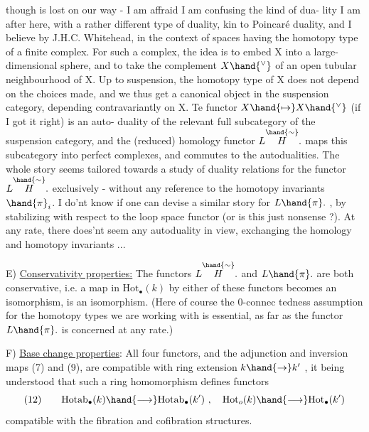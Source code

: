 
 though is lost on our way - I am affraid I am confusing the kind of dua-%
lity I am after here, with a rather different type of duality, kin to
Poincaré duality, and   I believe by J.H.C. Whitehead, in the context
of spaces having the homotopy type of a finite complex. For such a
complex, the idea  is to embed X into a large-dimensional sphere, and
to take the complement $X\hand{^{\vee}}$ of an open tubular neighbourhood of X. Up to
suspension, the homotopy type of X does not depend on the choices made,
and  we thus get a canonical object in the suspension category, depending
contravariantly on X. Te functor $X\hand{\mapsto}X\hand{^{\vee}}$ (if I got it right) is an auto-%
duality of the relevant full subcategory of the suspension category,
and the (reduced) homology functor $L\overset{\hand{\sim}}{H}.$  maps this subcategory
into perfect complexes, and commutes to the autodualities. The whole
story seems tailored towards a study of duality relations for the functor
$L\overset{\hand{\sim}}{H}.$ exclusively - without any reference to the homotopy invariants $\hand{\pi}_{i}$.
I do'nt know if one can devise a similar story for $L\hand{\pi}.$ , by stabilizing
with respect to the loop space functor (or is this just nonsense ?). At
any rate, there does'nt seem any autoduality in view, exchanging the
homology and homotopy invariants ...

E) \uline{Conservativity properties:} The functors $L\overset{\hand{\sim}}{H}.$ and $L\hand{\pi}.$ are both
conservative, i.e. a map in $\mathrm{Hot}_{\bullet}(k)$   by either of these functors
becomes an isomorphism, is an isomorphism. (Here of course the 0-connec%
\hand{-}tedness assumption for the  homotopy types we are working
with is essential, as far as the functor $L\hand{\pi}.$ is concerned at any rate.)

F) \uline{Base change properties}: All four functors, and the adjunction
and inversion maps (7) and (9), are compatible with ring extension
$k\hand{\to} k'$ , it being understood that such a ring homomorphism defines
functors
\[ (12)\qquad \mathrm{Hotab}_{\bullet}(k)\hand{\longrightarrow}\mathrm{Hotab}_{\bullet}(k') \ , \quad \mathrm{Hot}_{o}(k)\hand{\longrightarrow}\mathrm{Hot}_{\bullet}(k') \]
compatible with the fibration and cofibration structures.

